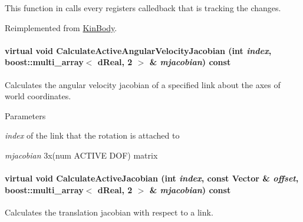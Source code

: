 This function in calls every registers calledback that is tracking the changes. 

Reimplemented from \hyperlink{classOpenRAVE_1_1KinBody_a218a09068212db7bb35c7d4ce792e309}{KinBody}.

\hypertarget{classOpenRAVE_1_1RobotBase_a86ad4866d727f58a05ffd898ff411ee0}{
\paragraph[{CalculateActiveAngularVelocityJacobian}]{\setlength{\rightskip}{0pt plus 5cm}virtual void CalculateActiveAngularVelocityJacobian (int {\em index}, \/  boost::multi\_\-array$<$ dReal, 2 $>$ \& {\em mjacobian}) const}\hfill}
\label{classOpenRAVE_1_1RobotBase_a86ad4866d727f58a05ffd898ff411ee0}
Calculates the angular velocity jacobian of a specified link about the axes of world coordinates.


\begin{DoxyParams}{Parameters}
\item[{\em index}]of the link that the rotation is attached to \item[{\em mjacobian}]3x(num ACTIVE DOF) matrix \end{DoxyParams}
\hypertarget{classOpenRAVE_1_1RobotBase_a93636f2303581a0614c9520d3351afc2}{
\paragraph[{CalculateActiveJacobian}]{\setlength{\rightskip}{0pt plus 5cm}virtual void CalculateActiveJacobian (int {\em index}, \/  const Vector \& {\em offset}, \/  boost::multi\_\-array$<$ dReal, 2 $>$ \& {\em mjacobian}) const}\hfill}
\label{classOpenRAVE_1_1RobotBase_a93636f2303581a0614c9520d3351afc2}


Calculates the translation jacobian with respect to a link. 

